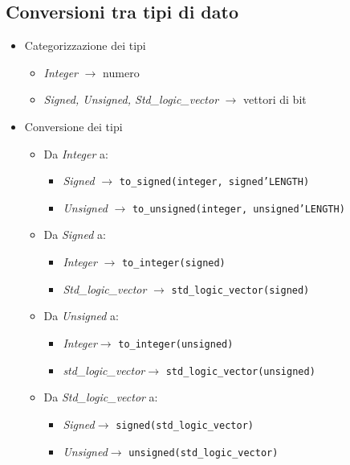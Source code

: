 \documentclass{article}
\begin{document}
\subsection{Conversioni tra tipi di dato}
\begin{itemize}
  \item Categorizzazione dei tipi
        \begin{itemize}
          \item \textit{Integer} \(\rightarrow\) numero
          \item \textit{Signed, Unsigned, Std\_logic\_vector} \(\rightarrow\) vettori di bit
        \end{itemize}
  \item Conversione dei tipi
        \begin{itemize}
          \item Da \textit{Integer} a:
                \begin{itemize}
                  \item \textit{Signed} \(\rightarrow\) \texttt{to\_signed(integer, signed'LENGTH)}
                  \item \textit{Unsigned} \(\rightarrow\) \texttt{to\_unsigned(integer, unsigned'LENGTH)}
                \end{itemize}
          \item Da \textit{Signed} a:
                \begin{itemize}
                  \item \textit{Integer} \(\rightarrow\) \texttt{to\_integer(signed)}
                  \item \textit{Std\_logic\_vector} \(\rightarrow\) \texttt{std\_logic\_vector(signed)}
                \end{itemize}
          \item Da \textit{Unsigned} a:
                \begin{itemize}
                  \item \textit{Integer}\(\rightarrow\) \texttt{to\_integer(unsigned)}
                  \item \textit{std\_logic\_vector}\(\rightarrow\) \texttt{std\_logic\_vector(unsigned)}
                \end{itemize}
          \item Da \textit{Std\_logic\_vector} a:
                \begin{itemize}
                  \item \textit{Signed}\(\rightarrow\) \texttt{signed(std\_logic\_vector)}
                  \item \textit{Unsigned}\(\rightarrow\) \texttt{unsigned(std\_logic\_vector)}
                \end{itemize}
        \end{itemize}
\end{itemize}
\end{document}

